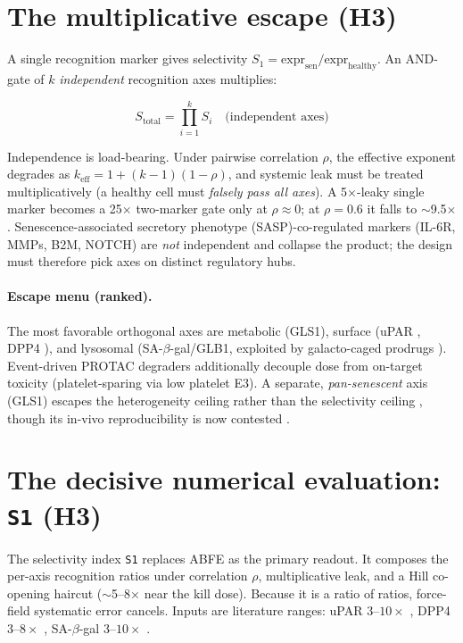\documentclass[11pt,a4paper]{article}
\newcommand{\Stot}{S_{\mathrm{total}}}
\begin{document}
\section{The multiplicative escape (H3)}
\label{sec:escape}

A single recognition marker gives selectivity $S_1=\text{expr}_{\mathrm{sen}}/\text{expr}_{\mathrm{healthy}}$.
An AND-gate of $k$ \emph{independent} recognition axes multiplies:

\begin{equation}
\boxed{\;\Stot = \prod_{i=1}^{k} S_i \quad\text{(independent axes)}\;}
\label{eq:andgate}
\end{equation}

Independence is load-bearing. Under pairwise correlation $\rho$, the effective
exponent degrades as $k_{\mathrm{eff}}=1+(k-1)(1-\rho)$, and systemic leak must
be treated multiplicatively (a healthy cell must \emph{falsely pass all axes}).
A 5$\times$-leaky single marker becomes a 25$\times$ two-marker gate only at
$\rho\!\approx\!0$; at $\rho=0.6$ it falls to $\sim$9.5$\times$. Senescence-associated
secretory phenotype (SASP)-co-regulated markers (IL-6R, MMPs, B2M, NOTCH) are
\emph{not} independent and collapse the product; the design must therefore pick
axes on distinct regulatory hubs.

\paragraph{Escape menu (ranked).}
The most favorable orthogonal axes are metabolic (GLS1), surface
(uPAR \citep{amor2020}, DPP4 \citep{dpp4}), and lysosomal
(SA-$\beta$-gal/GLB1, exploited by galacto-caged prodrugs
\citep{navgal2020,guerrero2020}). Event-driven PROTAC degraders
\citep{pz15227,dt2216} additionally decouple dose from on-target toxicity
(platelet-sparing via low platelet E3). A separate, \emph{pan-senescent} axis
(GLS1) escapes the heterogeneity ceiling rather than the selectivity ceiling
\citep{johmura2021}, though its in-vivo reproducibility is now contested
\citep{gls1repro}.

\section{The decisive numerical evaluation: \texttt{S1} (H3)}
\label{sec:s1}

The selectivity index \texttt{S1} replaces ABFE as the primary readout. It
composes the per-axis recognition ratios under correlation $\rho$, multiplicative
leak, and a Hill co-opening haircut ($\sim$5--8$\times$ near the kill dose).
Because it is a ratio of ratios, force-field systematic error cancels. Inputs
are literature ranges: uPAR $3$--$10\times$ \citep{amor2020}, DPP4
$3$--$8\times$ \citep{dpp4}, SA-$\beta$-gal $3$--$10\times$ \citep{lee2006}.
\end{document}
